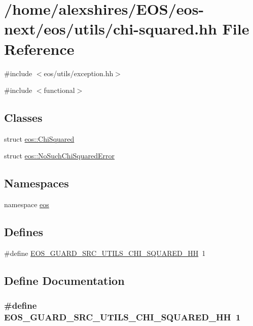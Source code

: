 \hypertarget{chi-squared_8hh}{
\section{/home/alexshires/EOS/eos-\/next/eos/utils/chi-\/squared.hh File Reference}
\label{chi-squared_8hh}
}
{\ttfamily \#include $<$eos/utils/exception.hh$>$}\par
{\ttfamily \#include $<$functional$>$}\par
\subsection*{Classes}
\begin{DoxyCompactItemize}
\item 
struct \hyperlink{structeos_1_1ChiSquared}{eos::ChiSquared}
\item 
struct \hyperlink{structeos_1_1NoSuchChiSquaredError}{eos::NoSuchChiSquaredError}
\end{DoxyCompactItemize}
\subsection*{Namespaces}
\begin{DoxyCompactItemize}
\item 
namespace \hyperlink{namespaceeos}{eos}
\end{DoxyCompactItemize}
\subsection*{Defines}
\begin{DoxyCompactItemize}
\item 
\#define \hyperlink{chi-squared_8hh_ae30f53ca6bf69d4e5c12f08df13686f1}{EOS\_\-GUARD\_\-SRC\_\-UTILS\_\-CHI\_\-SQUARED\_\-HH}~1
\end{DoxyCompactItemize}


\subsection{Define Documentation}
\hypertarget{chi-squared_8hh_ae30f53ca6bf69d4e5c12f08df13686f1}{
\subsubsection[{EOS\_\-GUARD\_\-SRC\_\-UTILS\_\-CHI\_\-SQUARED\_\-HH}]{\setlength{\rightskip}{0pt plus 5cm}\#define EOS\_\-GUARD\_\-SRC\_\-UTILS\_\-CHI\_\-SQUARED\_\-HH~1}}
\label{chi-squared_8hh_ae30f53ca6bf69d4e5c12f08df13686f1}
